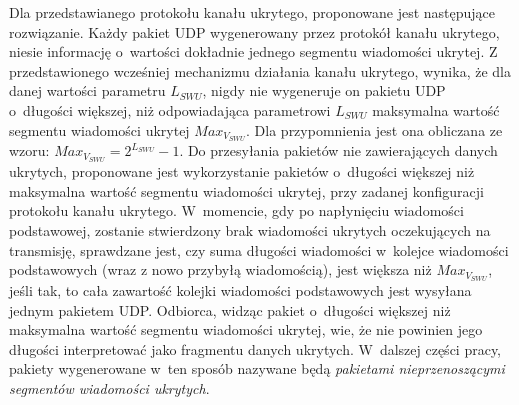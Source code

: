 \documentclass[a4paper, twoside, openright, 12pt]{report}
\begin{document}
    Dla przedstawianego protokołu kanału ukrytego, proponowane jest następujące
    rozwiązanie. Każdy pakiet UDP wygenerowany przez protokół kanału ukrytego,
    niesie informację o~wartości dokładnie jednego segmentu wiadomości ukrytej.
    Z przedstawionego wcześniej mechanizmu
    działania kanału ukrytego, wynika, że dla danej wartości parametru \( L_{SWU} \),
    nigdy nie wygeneruje on pakietu UDP o~długości większej, niż odpowiadająca parametrowi
    \( L_{SWU} \) maksymalna wartość segmentu wiadomości ukrytej \( Max_{V_{SWU}} \).
    Dla przypomnienia jest ona obliczana ze wzoru:
    \begin{math}
        Max_{V_{SWU}} = 2^{L_{SWU}} - 1
    \end{math}.
    Do przesyłania pakietów nie zawierających danych ukrytych, proponowane jest
    wykorzystanie pakietów o~długości większej niż maksymalna wartość segmentu
    wiadomości ukrytej, przy zadanej konfiguracji protokołu kanału ukrytego. W~momencie,
    gdy po napłynięciu wiadomości podstawowej, zostanie stwierdzony brak wiadomości
    ukrytych oczekujących na transmisję, sprawdzane jest, czy suma długości wiadomości
    w~kolejce wiadomości podstawowych (wraz z nowo przybyłą wiadomością), jest
    większa niż \( Max_{V_{SWU}} \), jeśli tak, to cała zawartość kolejki wiadomości
    podstawowych jest wysyłana jednym pakietem UDP. Odbiorca, widząc pakiet o~długości
    większej niż maksymalna wartość segmentu wiadomości ukrytej, wie, że nie powinien
    jego długości interpretować jako fragmentu danych ukrytych. W~dalszej części
    pracy, pakiety wygenerowane w~ten sposób nazywane będą
    \emph{pakietami nieprzenoszącymi segmentów wiadomości ukrytych}.
\end{document}
